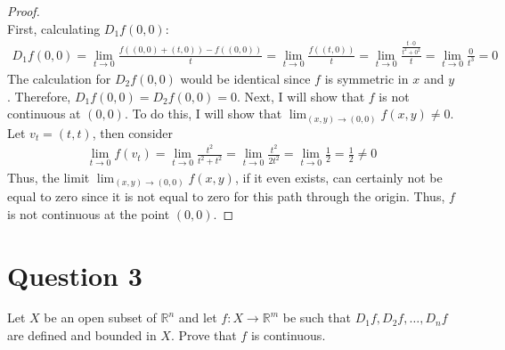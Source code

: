 \documentclass[10pt,a4paper]{article}
\theoremstyle{definition}
\theoremstyle{definition}
\numberwithin{equation}{section}
\begin{document}
\begin{proof}$ $
\\First, calculating $D_1f(0,0)$:
\begin{align*}
D_1f(0,0) = \lim_{t \to 0} \frac{f((0,0) + (t, 0)) - f((0,0))}{t} = \lim_{t \to 0} \frac{f((t, 0))}{t} = \lim_{t \to 0} \frac{\frac{t \cdot 0}{t^2 + 0^2}}{t} =\lim_{t \to 0} \frac{0}{t^3} = 0
\end{align*}
The calculation for $D_2f(0, 0)$ would be identical since $f$ is symmetric in $x$ and $y$. Therefore, $D_1f(0, 0) = D_2f(0, 0) = 0$. Next, I will show that $f$ is not continuous at $(0, 0)$. To do this, I will show that $\lim_{(x, y) \to (0, 0)}f(x, y) \neq 0$. Let $v_t = (t, t)$, then consider
\begin{align*}
\lim_{t \to 0} f(v_t) = \lim_{t \to 0} \frac{t^2}{t^2 + t^2} = \lim_{t \to 0} \frac{t^2}{2t^2} = \lim_{t \to 0} \frac{1}{2} = \frac{1}{2} \neq 0
\end{align*}
Thus, the limit $\lim_{(x, y) \to (0, 0)} f(x, y)$, if it even exists, can certainly not be equal to zero since it is not equal to zero for this path through the origin. Thus, $f$ is not continuous at the point $(0, 0)$. 
\end{proof}

\section*{Question 3}
Let $X$ be an open subset of $\mathbb{R}^n$ and let $f: X \to \mathbb{R}^m$ be such that $D_1f, D_2f, \ldots, D_nf$ are defined and bounded in $X$. Prove that $f$ is continuous. 
\end{document}
